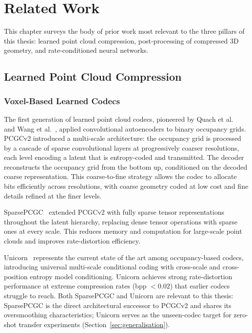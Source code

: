 \chapter{Related Work}
\label{ch:related}

This chapter surveys the body of prior work most relevant to the three
pillars of this thesis: learned point cloud compression, post-processing
of compressed 3D geometry, and rate-conditioned neural networks.

\section{Learned Point Cloud Compression}
\label{sec:related-compression}

\subsection{Voxel-Based Learned Codecs}

The first generation of learned point cloud codecs, pioneered by
Quach et al.~\cite{quach2019learning} and Wang et al.~\cite{wang2021multiscale},
applied convolutional autoencoders to binary occupancy grids.
PCGCv2 introduced a multi-scale architecture:
the occupancy grid is processed by a cascade of sparse convolutional layers
at progressively coarser resolutions, each level encoding a latent that
is entropy-coded and transmitted.
The decoder reconstructs the occupancy grid from the bottom up, conditioned
on the decoded coarse representation.
This coarse-to-fine strategy allows the codec to allocate bits efficiently
across resolutions, with coarse geometry coded at low cost and fine details
refined at the finer levels.

SparsePCGC~\cite{wang2023sparsepcgc} extended PCGCv2 with fully sparse
tensor representations throughout the latent hierarchy, replacing dense
tensor operations with sparse ones at every scale.
This reduces memory and computation for large-scale point clouds and improves
rate-distortion efficiency.

Unicorn~\cite{wang2025unicorn} represents the current state of the art among
occupancy-based codecs, introducing universal multi-scale conditional coding
with cross-scale and cross-position entropy model conditioning.
Unicorn achieves strong rate-distortion performance at extreme compression
rates (bpp $< 0.02$) that earlier codecs struggle to reach.
Both SparsePCGC and Unicorn are relevant to this thesis: SparsePCGC is the
direct architectural successor to PCGCv2 and shares its oversmoothing
characteristics; Unicorn serves as the unseen-codec target for zero-shot
transfer experiments (Section~\ref{sec:generalisation}).

